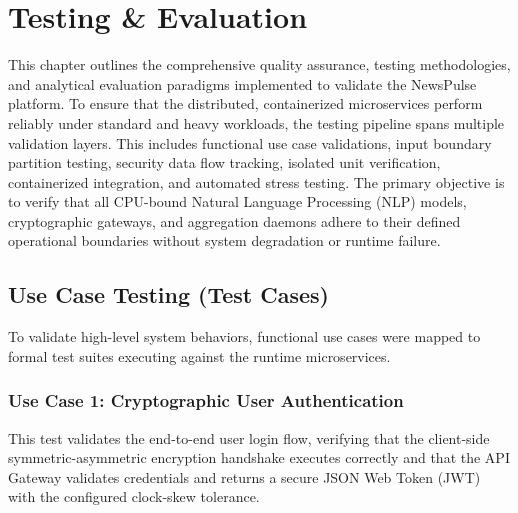 \chapter{Testing \& Evaluation}
\label{ch:testing-evaluation-chapter}
\newpage

This chapter outlines the comprehensive quality assurance, testing methodologies, and analytical evaluation paradigms implemented to validate the NewsPulse platform. To ensure that the distributed, containerized microservices perform reliably under standard and heavy workloads, the testing pipeline spans multiple validation layers. This includes functional use case validations, input boundary partition testing, security data flow tracking, isolated unit verification, containerized integration, and automated stress testing. The primary objective is to verify that all CPU-bound Natural Language Processing (NLP) models, cryptographic gateways, and aggregation daemons adhere to their defined operational boundaries without system degradation or runtime failure.

\section{Use Case Testing (Test Cases)}
To validate high-level system behaviors, functional use cases were mapped to formal test suites executing against the runtime microservices.

\subsection{Use Case 1: Cryptographic User Authentication}
This test validates the end-to-end user login flow, verifying that the client-side symmetric-asymmetric encryption handshake executes correctly and that the API Gateway validates credentials and returns a secure JSON Web Token (JWT) with the configured clock-skew tolerance.

